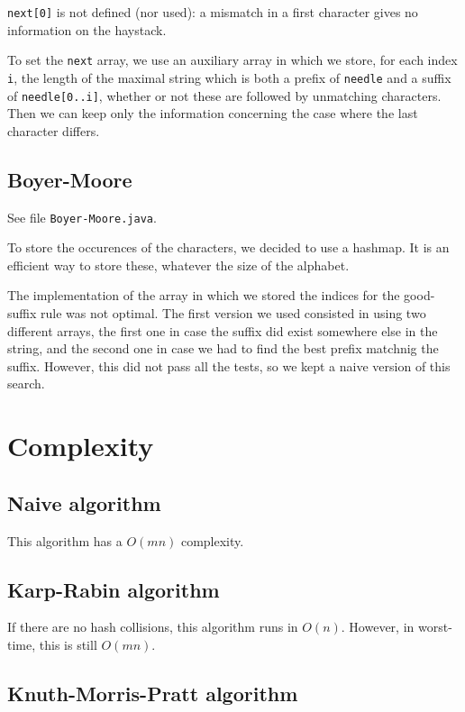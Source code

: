 \documentclass[a4paper,11pt]{article}
\begin{document}
\nolinkurl{next[0]} is not defined (nor used): a mismatch in a first character gives no information on the haystack.

To set the \nolinkurl{next} array, we use an auxiliary array in which we store, for each index \nolinkurl{i}, the length of the maximal string which is both a prefix of \nolinkurl{needle} and a suffix of \nolinkurl{needle[0..i]}, whether or not these are followed by unmatching characters. Then we can keep only the information concerning the case where the last character differs.



\subsection{Boyer-Moore}

See file \nolinkurl{Boyer-Moore.java}. 

To store the occurences of the characters, we decided to use a hashmap. It is an efficient way to store these, whatever the size of the alphabet.

The implementation of the array in which we stored the indices for the good-suffix rule was not optimal. The first version we used consisted in using two different arrays, the first one in case the suffix did exist somewhere else in the string, and the second one in case we had to find the best prefix matchnig the suffix. However, this did not pass all the tests, so we kept a naive version of this search.



\section{Complexity}

\subsection{Naive algorithm}

This algorithm has a $O(mn)$ complexity.


\subsection{Karp-Rabin algorithm}

If there are no hash collisions, this algorithm runs in $O(n)$. However, in worst-time, this is still $O(mn)$.


\subsection{Knuth-Morris-Pratt algorithm}
\end{document}
